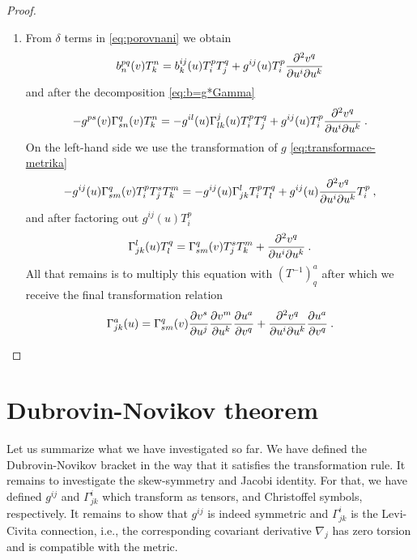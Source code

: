 \begin{proof}
\begin{enumerate}
        \item From $\delta$ terms in \eqref{eq:porovnani} we obtain
        \begin{align}
            b^{pq}_n(v) T^n_k =
            b^{ij}_k(u) T^p_i T^q_j + g^{ij}(u) T^p_i \frac{\partial^2 v^q}{\partial u^i \partial u^k}
        \end{align}
        and after the decomposition \eqref{eq:b=g*Gamma}
        \begin{align}
            - g^{ps}(v) \Gamma^{q}_{sn}(v) T^n_k =
            - g^{il}(u) \Gamma^j_{lk}(u) T^p_i T^q_j + g^{ij}(u) T^p_i \frac{\partial^2 v^q}{\partial u^i \partial u^k} \:.
        \end{align}
        On the left-hand side we use the transformation of $g$ \eqref{eq:transformace-metrika}
        \begin{align}
            -g^{ij}(u) \Gamma^q_{sm}(v) T^p_i T^s_j T^m_k = - g^{ij}(u) \Gamma^l_{jk} T^p_i T^q_l + g^{ij}(u) \frac{\partial^2 v^q}{\partial u^i \partial u^k} T^p_i \:,
        \end{align}
        and after factoring out $g^{ij}(u) T^p_i$
        \begin{align}
            \Gamma^l_{jk}(u) T^q_l = \Gamma^q_{sm}(v) T^s_j T^m_k + \frac{\partial^2 v^q}{\partial u^i \partial u^k} \:.
        \end{align}
        All that remains is to multiply this equation with $(T^{-1})^a_q$ after which we receive the final transformation relation
        \begin{align}
            \Gamma^a_{jk}(u) = \Gamma^q_{sm}(v) \frac{\partial v^s}{\partial u^j} \frac{\partial v^m}{\partial u^k} \frac{\partial u^a}{\partial v^q} + \frac{\partial^2 v^q}{\partial u^i \partial u^k} \frac{\partial u^a}{\partial v^q} \:.
        \end{align}
    \end{enumerate}
\end{proof}



\section{Dubrovin-Novikov theorem}

Let us summarize what we have investigated so far. We have defined the Dubrovin-Novikov bracket in the way that it satisfies the transformation rule. It remains to investigate the skew-symmetry and Jacobi identity. For that, we have defined $g^{ij}$ and $\Gamma^i_{jk}$ which transform as tensors, and Christoffel symbols, respectively. It remains to show that $g^{ij}$ is indeed symmetric and $\Gamma^i_{jk}$ is the Levi-Civita connection, i.e., the corresponding covariant derivative $\nabla_j$ has zero torsion and is compatible with the metric.

